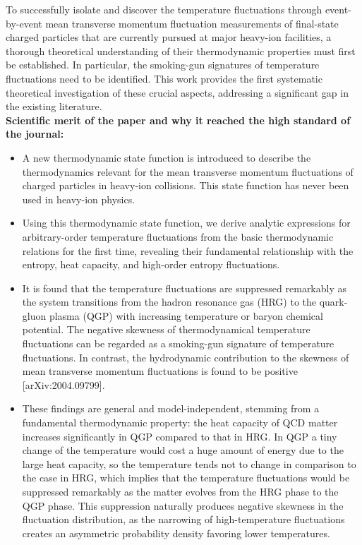 \documentclass[a4paper,11pt, oneside,titlepage]{article}
\begin{document}
\noindent To successfully isolate and discover the temperature fluctuations through event-by-event mean transverse momentum fluctuation measurements of final-state charged particles that are currently pursued at major heavy-ion facilities, a thorough theoretical understanding of their thermodynamic properties must first be established. In particular, the smoking-gun signatures of temperature fluctuations need to be identified. This work provides the first systematic theoretical investigation of these crucial aspects, addressing a significant gap in the existing literature. \\

\noindent \textbf{Scientific merit of the paper and why it reached the high standard of the journal:}\\[-1.5ex] 

\begin{itemize}

\item[$\bullet$] A new thermodynamic state function is introduced to describe the thermodynamics relevant for the mean transverse momentum fluctuations of charged particles in heavy-ion collisions. This state function has never been used in heavy-ion physics.

\item[$\bullet$] Using this thermodynamic state function, we derive analytic expressions for arbitrary-order temperature fluctuations from the basic thermodynamic relations for the first time, revealing their fundamental relationship with the entropy, heat capacity, and high-order entropy fluctuations.

\item[$\bullet$] It is found that the temperature fluctuations are suppressed remarkably as the system transitions from the hadron resonance gas (HRG) to the quark-gluon plasma (QGP) with increasing temperature or baryon chemical potential. The negative skewness of thermodynamical temperature fluctuations can be regarded as a smoking-gun signature of temperature fluctuations. In contrast, the hydrodynamic contribution to the skewness of mean transverse momentum fluctuations is found to be positive [arXiv:2004.09799].

\item[$\bullet$] These findings are general and model-independent, stemming from a fundamental thermodynamic property: the heat capacity of QCD matter increases significantly in QGP compared to that in HRG. In QGP a tiny change of the temperature would cost a huge amount of energy due to the large heat capacity, so the temperature tends not to change in comparison to the case in HRG, which implies that the temperature fluctuations would be suppressed remarkably as the matter evolves from the HRG phase to the QGP phase. This suppression naturally produces negative skewness in the fluctuation distribution, as the narrowing of high-temperature fluctuations creates an asymmetric probability density favoring lower temperatures. 


\end{itemize}
\end{document}
